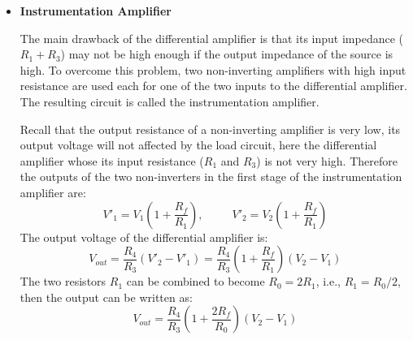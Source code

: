 \documentclass{article}
\begin{document}
\begin{itemize}
\item {\bf Instrumentation Amplifier}


  The main drawback of the differential amplifier is that its input 
  impedance ($R_1+R_3$) may not be high enough if the output impedance 
  of the source is high. To overcome this problem, two non-inverting
  amplifiers with high input resistance are used each for one of the
  two inputs to the differential amplifier. The resulting circuit is 
  called the instrumentation amplifier.


  Recall that the output resistance of a non-inverting amplifier is 
  very low, its output voltage will not affected by the load circuit, 
  here the differential amplifier whose its input resistance ($R_1$ 
  and $R_3$) is not very high. Therefore the outputs of the two 
  non-inverters in the first stage of the instrumentation amplifier 
  are:
  \begin{equation}
  V'_1=V_1\left(1+\frac{R_f}{R_1}\right),\;\;\;\;\;\;\;\;\;
  V'_2=V_2\left(1+\frac{R_f}{R_1}\right) 
  \end{equation}
  The output voltage of the differential amplifier is:
  \begin{equation} 
  V_{out}=\frac{R_4}{R_3}(V'_2-V'_1)
  =\frac{R_4}{R_3}\left(1+\frac{R_f}{R_1}\right)(V_2-V_1) 
  \end{equation}
  The two resistors $R_1$ can be combined to become $R_0=2R_1$,
  i.e., $R_1=R_0/2$, then the output can be written as:
  \begin{equation}
  V_{out}=\frac{R_4}{R_3}\left(1+\frac{2R_f}{R_0}\right)(V_2-V_1) 
  \end{equation}


\end{itemize}
\end{document}

